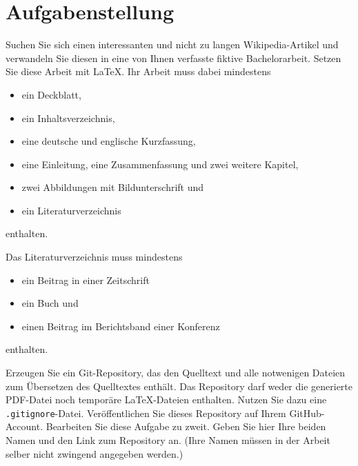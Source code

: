 \cleardoublepage


\section*{Aufgabenstellung}

Suchen Sie sich einen interessanten und nicht zu langen Wikipedia-Artikel und verwandeln Sie diesen in 
eine von Ihnen verfasste fiktive Bachelorarbeit. Setzen Sie diese Arbeit mit LaTeX. Ihr Arbeit muss 
dabei mindestens

\begin{itemize}
    \item ein Deckblatt,
    \item ein Inhaltsverzeichnis,
    \item eine deutsche und englische Kurzfassung,
    \item eine Einleitung, eine Zusammenfassung und zwei weitere Kapitel,
    \item zwei Abbildungen mit Bildunterschrift und
    \item ein Literaturverzeichnis
\end{itemize}

enthalten.

Das Literaturverzeichnis muss mindestens

\begin{itemize}
    \item ein Beitrag in einer Zeitschrift
    \item ein Buch und
    \item einen Beitrag im Berichtsband einer Konferenz
\end{itemize}

enthalten.

Erzeugen Sie ein Git-Repository, das den Quelltext und alle notwenigen Dateien zum Übersetzen des Quelltextes enthält. Das Repository darf weder die generierte PDF-Datei noch temporäre LaTeX-Dateien enthalten. Nutzen Sie dazu eine \texttt{.gitignore}-Datei. Veröffentlichen Sie dieses Repository auf Ihrem GitHub-Account. Bearbeiten Sie diese Aufgabe zu zweit. Geben Sie hier Ihre beiden Namen und den Link zum Repository an. (Ihre Namen müssen in der Arbeit selber nicht zwingend angegeben werden.)
